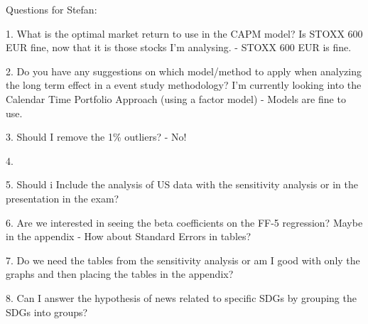 Questions for Stefan:

1. What is the optimal market return to use in the CAPM model? Is STOXX 600 EUR fine, now that it is those stocks I'm analysing. 
- STOXX 600 EUR is fine. 

2. Do you have any suggestions on which model/method to apply when analyzing the long term effect in a event study methodology? I'm currently looking into the Calendar Time Portfolio Approach (using a factor model) - Models are fine to use. 

3. Should I remove the 1\% outliers?
- No!

4.

5.  Should i Include the analysis of US data with the sensitivity analysis or in the presentation in the exam?

6. Are we interested in seeing the beta coefficients on the FF-5 regression? Maybe in the appendix
- How about Standard Errors in tables?

7. Do we need the tables from the sensitivity analysis or am I good with only the graphs and then placing the tables in the appendix?

8. Can I answer the hypothesis of news related to specific SDGs by grouping the SDGs into groups?